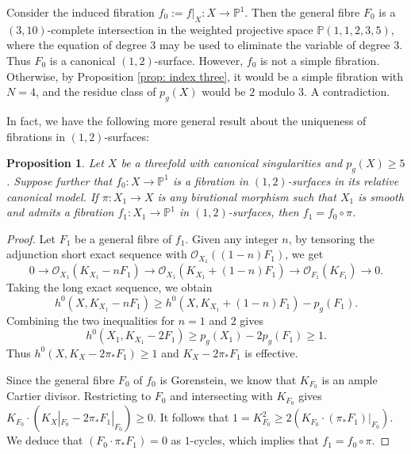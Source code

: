 \documentclass[a4paper,11pt]{amsart}
\newcommand{\PP}{\ensuremath{\mathbb{P}}}
\newtheorem{prop}[thm]{Proposition}
\theoremstyle{definition}
\theoremstyle{remark}
\numberwithin{equation}{section}
\begin{document}
Consider the induced fibration $f_0 := f|_X\colon X \to \PP^1$. Then the general fibre $F_0$ is a $(3, 10)$-complete intersection in the weighted projective space $\PP(1,1,2,3,5)$, where the equation of degree $3$ may be used to eliminate the variable of degree $3$. Thus $F_0$ is a canonical $(1,2)$-surface. However, $f_0$ is not a simple fibration. Otherwise, by Proposition \ref{prop: index three}, it would be a simple fibration with $N = 4$, and the residue class of $p_g(X)$ would be $2$ modulo $3$. A contradiction. 

In fact, we have the following more general result about the uniqueness of fibrations in $(1,2)$-surfaces:

\begin{prop} \label{prop: uniqueness of fibration}
    Let $X$ be a threefold with canonical singularities and $p_g(X) \ge 5$. %
    Suppose further that $f_0 \colon X \to \PP^1$ is a fibration in $(1,2)$-surfaces in its relative canonical model. If $\pi \colon X_1 \to X$ is any birational morphism such that $X_1$ is smooth and admits a fibration $f_1 \colon X_1 \to \PP^1$ in $(1, 2)$-surfaces, then $f_1 = f_0 \circ \pi$.
\end{prop}

\begin{proof}
    Let $F_1$ be a general fibre of $f_1$. Given any integer $n$, by tensoring the adjunction short exact sequence with $\mathcal{O}_{X_1}((1-n)F_1)$, we get
    \[0\to \mathcal{O}_{X_1}(K_{X_1}-nF_1) \to 
    \mathcal{O}_{X_1}(K_{X_1}+(1-n)F_1) \to 
    \mathcal{O}_{F_1}(K_{F_1}) \to 0.\]
    Taking the long exact sequence, we obtain 
    $$
    h^0(X, K_{X_1} - nF_1) \ge h^0(X, K_{X_1} + (1-n)F_1) - p_g(F_1).
    $$
    Combining the two inequalities for $n = 1$ and $2$ gives
    $$
    h^0(X_1, K_{X_1} - 2F_1) \ge p_g(X_1) - 2p_g(F_1) \ge 1.
    $$
    Thus $h^0(X, K_X - 2\pi_*F_1) \ge 1$ and $K_X - 2\pi_*F_1$ is effective. 
    
    Since the general fibre $F_0$ of $f_0$ is Gorenstein, we know that $K_{F_0}$ is an ample Cartier divisor. Restricting to $F_0$ and intersecting with $K_{F_0}$ gives $K_{F_0} \cdot (K_X|_{F_0} - 2\pi_*F_1|_{F_0}) \ge0$. %
    It follows that $1 = K_{F_0}^2 \ge 2 \left(K_{F_0} \cdot (\pi_*F_1)|_{F_0} \right)$. We deduce that $(F_0 \cdot \pi_*F_1) = 0$ as $1$-cycles, which implies that $f_1 = f_0 \circ \pi$.
\end{proof}
\end{document}
